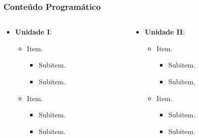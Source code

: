 \begin{frame}[t]\frametitle{Conteúdo Programático}

  \begin{columns}[onlytextwidth,T]

    \begin{column}{0.48\linewidth}
      \begin{itemize}
        \justifying{}
        \setlength\itemsep{1em}
        \item \textbf{Unidade I}:
        \begin{itemize}
          \justifying{}
          \setlength\itemsep{1em}
          \item Item.
          \begin{itemize}
            \justifying{}
            \item Subitem.
            \item Subitem.
          \end{itemize}
          \item Item.
          \begin{itemize}
            \justifying{}
            \item Subitem.
            \item Subitem.
          \end{itemize}
        \end{itemize}
      \end{itemize}
    \end{column}

    \begin{column}{0.48\linewidth}
      \begin{itemize}
        \justifying{}
        \setlength\itemsep{1em}
        \item \textbf{Unidade II}:
        \begin{itemize}
          \justifying{}
          \setlength\itemsep{1em}
          \item Item.
          \begin{itemize}
            \justifying{}
            \item Subitem.
            \item Subitem.
          \end{itemize}
          \item Item.
          \begin{itemize}
            \justifying{}
            \item Subitem.
            \item Subitem.
          \end{itemize}
        \end{itemize}
      \end{itemize}
    \end{column}

  \end{columns}

\end{frame}



